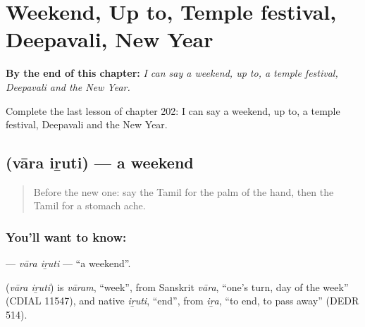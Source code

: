 
\chapter{Weekend, Up to, Temple festival, Deepavali, New Year}
\label{ch:ta-weekend-up-to-temple-festival-deepavali-new-year}

\begin{chapteropening}
\textbf{By the end of this chapter:} \emph{I can say a weekend, up to, a temple festival, Deepavali and the New Year.}

Complete the last lesson of chapter 202: I can say a weekend, up to, a temple festival, Deepavali and the New Year.
\end{chapteropening}

\section[\texorpdfstring{\ta{வார} \ta{இறுதி} (vāra iṟuti)}{வார இறுதி (vāra iṟuti)}]{  (vāra iṟuti) — a weekend}

\label{lesson:TA-C202-vara-iruti}



\begin{quote}
Before the new one: say the Tamil for the palm of the hand, then the Tamil for a stomach ache.
\end{quote}

\subsection*{You'll want to know:  }
\textbf{ } — \emph{vāra iṟuti} — \textquotedblleft{}a weekend\textquotedblright{}.

\begin{cousinweb}
\textbf{ } (\emph{vāra iṟuti}) is \emph{vāram}, \textquotedblleft{}week\textquotedblright{}, from Sanskrit \emph{vāra}, \textquotedblleft{}one's turn, day of the week\textquotedblright{} (CDIAL 11547), and native \emph{iṟuti}, \textquotedblleft{}end\textquotedblright{}, from \emph{iṟa}, \textquotedblleft{}to end, to pass away\textquotedblright{} (DEDR 514).
\end{cousinweb}

